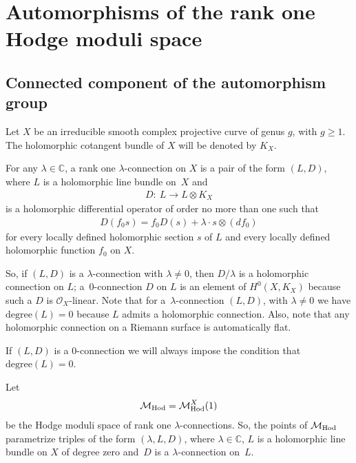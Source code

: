 \section{Automorphisms of the rank one Hodge moduli space}\label{auto-hodge}

\subsection{Connected component of the automorphism group}

Let $X$ be an irreducible smooth complex projective curve of genus $g$, with $g \geq 1$. The holomorphic cotangent bundle of $X$ will be denoted by $K_X$.
\begin{Definition} For any $\lambda \in \mathbb C$, a rank one $\lambda$-connection on $X$ is a pair of the form $(L, D)$, where $L$ is a holomorphic line bundle on~$X$ and
\begin{gather*}
D \colon \ L \longrightarrow L\otimes K_X
\end{gather*}
is a holomorphic dif\/ferential operator of order no more than one such that
\begin{gather*}
D(f_0s) = f_0D(s)+\lambda\cdot s\otimes (df_0)
\end{gather*}
for every locally def\/ined holomorphic section $s$ of $L$ and every locally def\/ined holomorphic function $f_0$ on $X$.
\end{Definition}

So, if $(L, D)$ is a $\lambda$-connection with $\lambda \not= 0$, then $D/\lambda$ is a holomorphic connection on $L$; a~$0$-connection $D$ on $L$ is an element of $H^0(X, K_X)$ because such a $D$ is ${\mathcal O}_X$-linear. Note that for a~$\lambda$-connection $(L, D)$, with $\lambda \not= 0$ we have $\text{degree}(L) = 0$ because $L$ admits a holomorphic connection. Also, note that any holomorphic connection on a Riemann surface is automatically f\/lat.

If $(L, D)$ is a $0$-connection we will always impose the condition that $\text{degree}(L) = 0$.

Let
\begin{gather*}
{\mathcal M}_{\rm Hod} = {\mathcal M}^X_{\rm Hod}(1)
\end{gather*}
be the Hodge moduli space of rank one $\lambda$-connections. So, the points of ${\mathcal M}_{\rm Hod}$ parametrize triples of the form $(\lambda, L, D)$, where $\lambda \in \mathbb C$, $L$ is a holomorphic line bundle on $X$ of degree zero and~$D$ is a $\lambda$-connection on~$L$.

